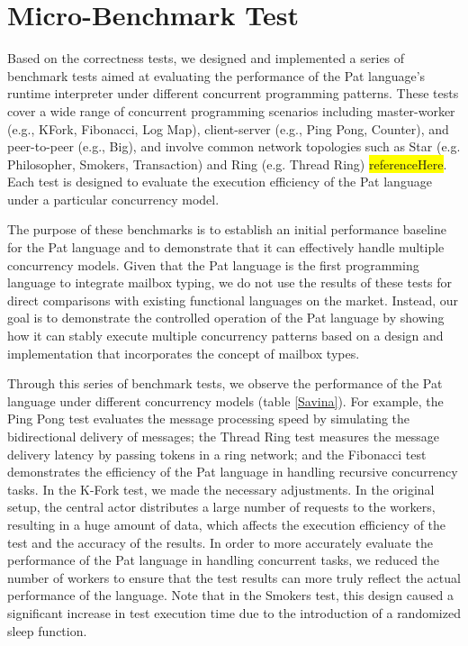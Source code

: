 \documentclass{l4proj}
\begin{document}
\section{Micro-Benchmark Test}

Based on the correctness tests, we designed and implemented a series of benchmark tests aimed at evaluating the performance of the Pat language's runtime interpreter under different concurrent programming patterns. These tests cover a wide range of concurrent programming scenarios including master-worker (e.g., KFork, Fibonacci, Log Map), client-server (e.g., Ping Pong, Counter), and peer-to-peer (e.g., Big), and involve common network topologies such as Star (e.g. Philosopher, Smokers, Transaction) and Ring (e.g. Thread Ring) \colorbox{yellow}{referenceHere}. Each test is designed to evaluate the execution efficiency of the Pat language under a particular concurrency model.

The purpose of these benchmarks is to establish an initial performance baseline for the Pat language and to demonstrate that it can effectively handle multiple concurrency models. Given that the Pat language is the first programming language to integrate mailbox typing, we do not use the results of these tests for direct comparisons with existing functional languages on the market. Instead, our goal is to demonstrate the controlled operation of the Pat language by showing how it can stably execute multiple concurrency patterns based on a design and implementation that incorporates the concept of mailbox types.

Through this series of benchmark tests, we observe the performance of the Pat language under different concurrency models (table \ref{Savina}). For example, the Ping Pong test evaluates the message processing speed by simulating the bidirectional delivery of messages; the Thread Ring test measures the message delivery latency by passing tokens in a ring network; and the Fibonacci test demonstrates the efficiency of the Pat language in handling recursive concurrency tasks. In the K-Fork test, we made the necessary adjustments. In the original setup, the central actor distributes a large number of requests to the workers, resulting in a huge amount of data, which affects the execution efficiency of the test and the accuracy of the results. In order to more accurately evaluate the performance of the Pat language in handling concurrent tasks, we reduced the number of workers to ensure that the test results can more truly reflect the actual performance of the language. Note that in the Smokers test, this design caused a significant increase in test execution time due to the introduction of a randomized sleep function.
\end{document}
